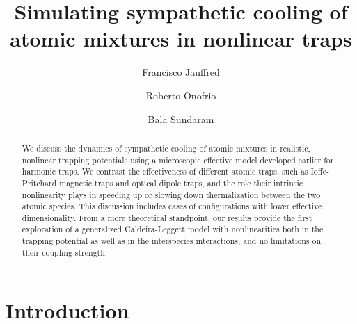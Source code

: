 \documentclass[pra,letterpaper,onecolumn,superscriptaddress,floatfix]{revtex4}
\begin{document}
\title{Simulating sympathetic cooling of atomic mixtures in nonlinear traps}

\author{Francisco Jauffred}


\author{Roberto Onofrio}



\author{Bala Sundaram}


\begin{abstract}
We discuss the dynamics of sympathetic cooling of atomic mixtures in realistic, nonlinear trapping 
potentials using a microscopic effective model developed earlier for harmonic traps. 
We contrast the effectiveness of different atomic traps, such as Ioffe-Pritchard 
magnetic traps and optical dipole traps, and the role their intrinsic nonlinearity plays 
in speeding up or slowing down thermalization between the two atomic species. This discussion
includes cases of configurations with lower effective dimensionality. From a more theoretical 
standpoint, our results provide the first exploration of a generalized Caldeira-Leggett model with 
nonlinearities both in the trapping potential as well as in the interspecies interactions, 
and no limitations on their coupling strength. 
\end{abstract}

\maketitle

\section{Introduction}
\end{document}

